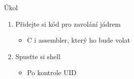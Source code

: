 \begin{frame}{Úkol}

  \begin{enumerate}
    \item Přidejte si kód pro zavolání jádrem
    \begin{itemize}
      \item C i assembler, který ho bude volat
    \end{itemize}

    \item Spusťte si shell
    \begin{itemize}
      \item Po kontrole UID
    \end{itemize}
  \end{enumerate}

\end{frame}


